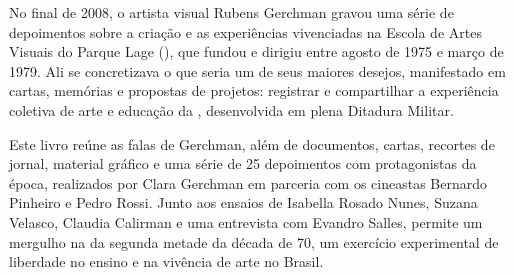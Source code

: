 \hspace*{-7cm}\hrulefill\hspace*{-7cm}

\medskip

\noindent{}No final de 2008, o artista visual Rubens Gerchman gravou uma série de depoimentos sobre a criação e as experiências vivenciadas na Escola de Artes Visuais do Parque Lage (), que fundou e dirigiu entre agosto de 1975 e março de 1979. Ali se concretizava o que seria um de seus maiores desejos, manifestado em cartas, memórias e propostas de projetos: registrar e compartilhar a experiência coletiva de arte e educação da , desenvolvida em plena Ditadura Militar.

Este livro reúne as falas de Gerchman, além de documentos, cartas, recortes de jornal, material gráfico e uma série de 25 depoimentos com protagonistas da época, realizados por Clara Gerchman em parceria com os cineastas Bernardo Pinheiro e Pedro Rossi. Junto aos ensaios de Isabella Rosado Nunes, Suzana Velasco, Claudia Calirman e uma entrevista com Evandro Salles, permite um mergulho na  da segunda metade da década de 70, um exercício experimental de liberdade no ensino e na vivência de arte no Brasil.


\vfill

\hspace*{-.4cm}\begin{minipage}[c]{.5\linewidth}
\small{
{}}
\end{minipage}


\pagebreak
\pagestyle{azouguecat}

